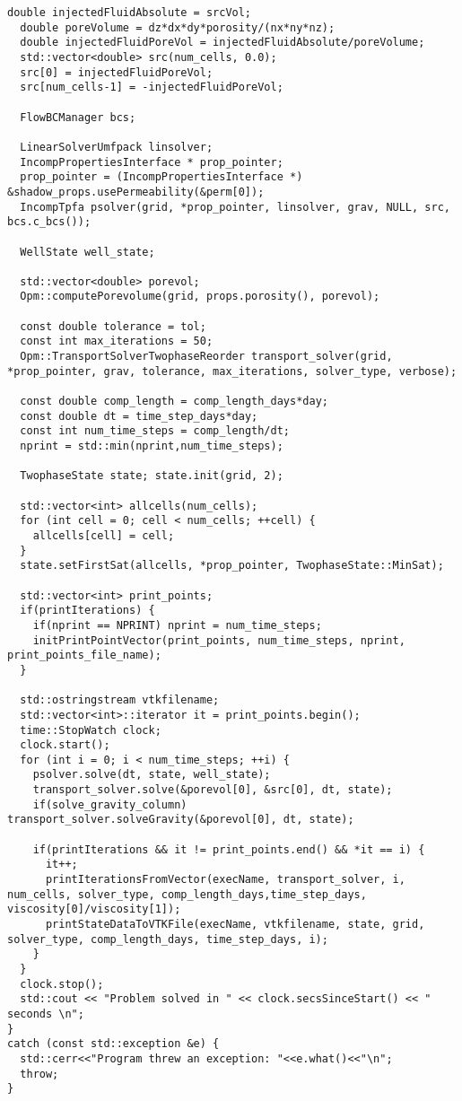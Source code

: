 \begin{lstlisting}[caption={The C++ program used to run the 3D numerical tests in Chapter \ref{chapter:numerical_results}},label={listing:test_driver_3D}]
  double injectedFluidAbsolute = srcVol;
  double poreVolume = dz*dx*dy*porosity/(nx*ny*nz);
  double injectedFluidPoreVol = injectedFluidAbsolute/poreVolume;
  std::vector<double> src(num_cells, 0.0);
  src[0] = injectedFluidPoreVol;
  src[num_cells-1] = -injectedFluidPoreVol;

  FlowBCManager bcs;
  
  LinearSolverUmfpack linsolver;
  IncompPropertiesInterface * prop_pointer;
  prop_pointer = (IncompPropertiesInterface *) &shadow_props.usePermeability(&perm[0]);
  IncompTpfa psolver(grid, *prop_pointer, linsolver, grav, NULL, src, bcs.c_bcs());
  
  WellState well_state;
  
  std::vector<double> porevol;
  Opm::computePorevolume(grid, props.porosity(), porevol);
  
  const double tolerance = tol;
  const int max_iterations = 50;
  Opm::TransportSolverTwophaseReorder transport_solver(grid, *prop_pointer, grav, tolerance, max_iterations, solver_type, verbose);

  const double comp_length = comp_length_days*day;
  const double dt = time_step_days*day;
  const int num_time_steps = comp_length/dt;
  nprint = std::min(nprint,num_time_steps);
  
  TwophaseState state; state.init(grid, 2);
  
  std::vector<int> allcells(num_cells);
  for (int cell = 0; cell < num_cells; ++cell) {
    allcells[cell] = cell;
  }
  state.setFirstSat(allcells, *prop_pointer, TwophaseState::MinSat);

  std::vector<int> print_points;
  if(printIterations) {
    if(nprint == NPRINT) nprint = num_time_steps;
    initPrintPointVector(print_points, num_time_steps, nprint, print_points_file_name);
  }  
  
  std::ostringstream vtkfilename;
  std::vector<int>::iterator it = print_points.begin();
  time::StopWatch clock;
  clock.start();
  for (int i = 0; i < num_time_steps; ++i) {
    psolver.solve(dt, state, well_state);
    transport_solver.solve(&porevol[0], &src[0], dt, state);
    if(solve_gravity_column) transport_solver.solveGravity(&porevol[0], dt, state);
    
    if(printIterations && it != print_points.end() && *it == i) {
      it++;
      printIterationsFromVector(execName, transport_solver, i, num_cells, solver_type, comp_length_days,time_step_days, viscosity[0]/viscosity[1]);
      printStateDataToVTKFile(execName, vtkfilename, state, grid, solver_type, comp_length_days, time_step_days, i);
    }
  }
  clock.stop();
  std::cout << "Problem solved in " << clock.secsSinceStart() << " seconds \n";
}
catch (const std::exception &e) {
  std::cerr<<"Program threw an exception: "<<e.what()<<"\n";
  throw;
}
\end{lstlisting}
